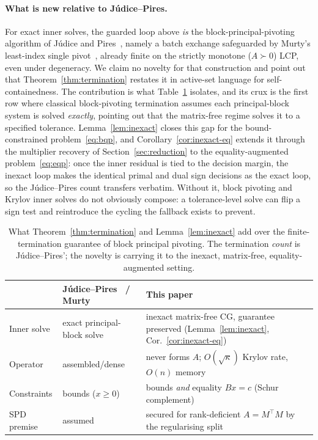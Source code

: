\paragraph{What is new relative to Júdice--Pires.}
For exact inner solves, the guarded loop above \emph{is} the block-principal-pivoting
algorithm of Júdice and Pires~\cite{judice1994}, namely a batch exchange safeguarded by Murty's
least-index single pivot~\cite{murty1988}, already finite on the strictly monotone
($A \succ 0$) LCP, even under degeneracy. We claim no novelty for that
construction and point out that Theorem~\ref{thm:termination} restates it in active-set language for
self-containedness. The contribution is what Table~\ref{tab:novelty} isolates, and its crux is
the first row where classical block-pivoting termination assumes each principal-block system is
solved \emph{exactly}, pointing out that the  matrix-free regime solves it to a specified tolerance.
Lemma~\ref{lem:inexact} closes this gap for the bound-constrained problem~\eqref{eq:bqp}, and
Corollary~\ref{cor:inexact-eq} extends it through the multiplier recovery of
Section~\ref{sec:reduction} to the equality-augmented problem~\eqref{eq:eqp}: once the inner
residual is tied to the decision margin, the inexact loop makes the identical primal and dual
sign decisions as the exact loop, so the Júdice--Pires count transfers verbatim. Without it,
block pivoting and Krylov inner solves do not obviously compose: a tolerance-level solve can
flip a sign test and reintroduce the cycling the fallback exists to prevent.

\begin{table}[ht]\centering\footnotesize
\begin{tabular}{lll}
\toprule
 & Júdice--Pires~\cite{judice1994} / Murty~\cite{murty1988} & This paper \\
\midrule
Inner solve  & exact principal-block solve & inexact matrix-free CG, guarantee preserved (Lemma~\ref{lem:inexact}, Cor.~\ref{cor:inexact-eq}) \\
Operator     & assembled/dense             & never forms $A$; $O(\sqrt\kappa)$ Krylov rate, $O(n)$ memory \\
Constraints  & bounds ($x\ge0$)            & bounds \emph{and} equality $Bx=c$ (Schur complement) \\
SPD premise  & assumed                     & secured for rank-deficient $A=M^\top M$ by the regularising split \\
\bottomrule
\end{tabular}
\caption{What Theorem~\ref{thm:termination} and Lemma~\ref{lem:inexact} add over the
finite-termination guarantee of block principal pivoting. The termination \emph{count} is
Júdice--Pires'; the novelty is carrying it to the inexact, matrix-free, equality-augmented
setting.}
\label{tab:novelty}
\end{table}

